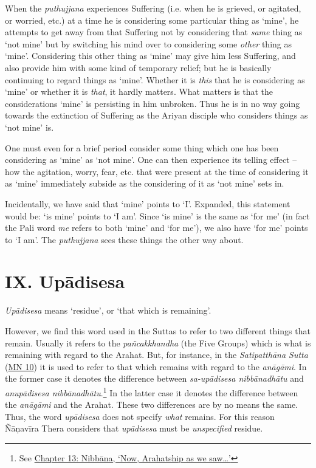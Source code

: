 When the \textit{puthujjana} experiences Suffering (i.e. when he is grieved, or agitated, or worried, etc.) at a time he is considering some particular thing as `mine', he attempts to get away from that Suffering not by considering that \emph{same} thing as `not mine' but by switching his mind over to considering some \emph{other} thing as `mine'. Considering this other thing as `mine' may give him less Suffering, and also provide him with some kind of temporary relief; but he is basically continuing to regard things as `mine'. Whether it is \emph{this} that he is considering as `mine' or whether it is \emph{that}, it hardly matters. What matters is that the considerations `mine' is persisting in him unbroken. Thus he is in no way going towards the extinction of Suffering as the Ariyan disciple who considers things as `not mine' is.

One must even for a brief period consider some thing which one has been considering as `mine' as `not mine'. One can then experience its telling effect -- how the agitation, worry, fear, etc. that were present at the time of considering it as `mine' immediately subside as the considering of it as `not mine' sets in.

Incidentally, we have said that `mine' points to `I'. Expanded, this statement would be: `is mine' points to `I am'. Since `is mine' is the same as `for me' (in fact the Pali word \emph{me} refers to both `mine' and `for me'), we also have `for me' points to `I am'. The \textit{puthujjana} sees these things the other way about.

\hypertarget{_ix_upux101disesa}{%
\section{IX. Upādisesa}\label{_ix_upux101disesa}}

\textit{Upādisesa} means `residue', or `that which is remaining'.

However, we find this word used in the Suttas to refer to two different things that remain. Usually it refers to the \textit{pañcakkhandha} (the Five Groups) which is what is remaining with regard to the Arahat. But, for instance, in the \textit{Satipatthāna Sutta} (\href{https://suttacentral.net/mn10/en/sujato}{MN 10}) it is used to refer to that which remains with regard to the \textit{anāgāmi}. In the former case it denotes the difference between \textit{sa-upādisesa nibbānadhātu} and \textit{anupādisesa nibbānadhātu}.\footnote{See \href{ch-13-nibbana.xml\#remainder}{Chapter 13: Nibbāna, `Now, Arahatship as we saw\ldots\hspace{0pt}'}} In the latter case it denotes the difference between the \textit{anāgāmi} and the Arahat. These two differences are by no means the same. Thus, the word \textit{upādisesa} does not specify \emph{what} remains. For this reason Ñāṇavīra Thera considers that \textit{upādisesa} must be \emph{unspecified} residue.

